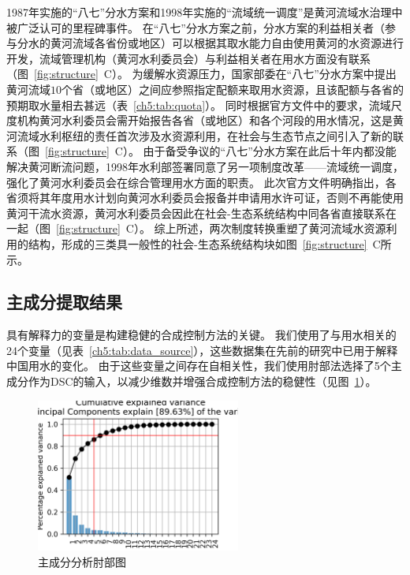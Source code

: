 1987年实施的“八七”分水方案和1998年实施的“流域统一调度”是黄河流域水治理中被广泛认可的里程碑事件。
在“八七”分水方案之前，分水方案的利益相关者（参与分水的黄河流域各省份或地区）可以根据其取水能力自由使用黄河的水资源进行开发，流域管理机构（黄河水利委员会）与利益相关者在用水方面没有联系（图~\ref{fig:structure}~C）。
为缓解水资源压力，国家部委在“八七”分水方案中提出黄河流域$10$个省（或地区）之间应参照指定配额来取用水资源，且该配额与各省的预期取水量相去甚远（表~\ref{ch5:tab:quota}）。
同时根据官方文件中的要求，流域尺度机构黄河水利委员会需开始报告各省（或地区）和各个河段的用水情况，这是黄河流域水利枢纽的责任首次涉及水资源利用，在社会与生态节点之间引入了新的联系（图~\ref{fig:structure}~C）。
由于备受争议的“八七”分水方案在此后十年内都没能解决黄河断流问题，1998年水利部签署同意了另一项制度改革——流域统一调度，强化了黄河水利委员会在综合管理用水方面的职责。
此次官方文件明确指出，各省须将其年度用水计划向黄河水利委员会报备并申请用水许可证，否则不再能使用黄河干流水资源，黄河水利委员会因此在社会-生态系统结构中同各省直接联系在一起（图~\ref{fig:structure}~C）。
综上所述，两次制度转换重塑了黄河流域水资源利用的结构，形成的三类具一般性的社会-生态系统结构块如图~\ref{fig:structure}~C所示。



\subsection{主成分提取结果}

具有解释力的变量是构建稳健的合成控制方法的关键。
我们使用了与用水相关的24个变量（见表~\ref{ch5:tab:data_source}），这些数据集在先前的研究中已用于解释中国用水的变化\cite{zhou2020}。
由于这些变量之间存在自相关性，我们使用肘部法选择了5个主成分作为DSC的输入，以减少维数并增强合成控制方法的稳健性（见图~\ref{ch5:fig:elbow}）。

\begin{figure}[htb]
    \centering
    \includegraphics[width=0.6\textwidth]{img/ch5/ch5_elbow.png}
    \caption{主成分分析肘部图}\label{ch5:fig:elbow}
\end{figure}

